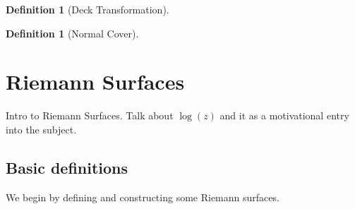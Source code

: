 \documentclass[11pt]{report}
\theoremstyle{definition}
\newtheorem{defn}[thm]{Definition}
\begin{document}
\begin{defn}[Deck Transformation]
  
\end{defn}
\begin{defn}[Normal Cover]

\end{defn}

\chapter{Riemann Surfaces}

Intro to Riemann Surfaces. Talk about $\log(z)$ and it as a motivational entry into the subject.


\section{Basic definitions}\label{bdefns}

We begin by defining and constructing some Riemann surfaces.
\end{document}
